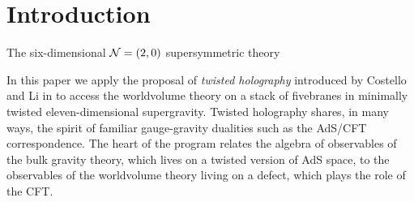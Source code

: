 \documentclass[11pt]{amsart}
\begin{document}
\section{Introduction}

The six-dimensional $\mathcal N=(2,0)$ supersymmetric theory 


In this paper we apply the proposal of \textit{twisted holography} introduced by Costello and Li in \cite{CLsugra} to access the worldvolume theory on a stack of fivebranes in minimally twisted eleven-dimensional supergravity.
Twisted holography shares, in many ways, the spirit of familiar gauge-gravity dualities such as the AdS/CFT correspondence. 
The heart of the program relates the algebra of observables of the bulk gravity theory, which lives on a twisted version of AdS space, to the observables of the worldvolume theory living on a defect, which plays the role of the CFT.
\end{document}
